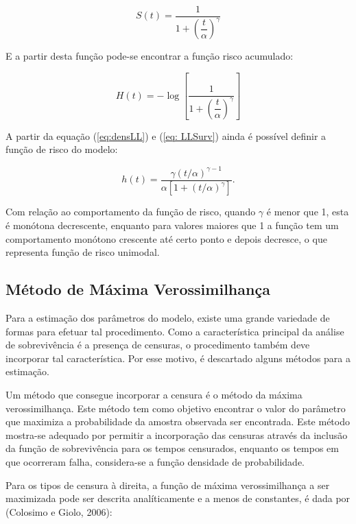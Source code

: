 \documentclass[a4paper,12pt]{article}
\begin{document}
\begin{equation} \label{eq: LLSurv}
  S(t) = \dfrac{1}{1 + \left(\dfrac{t}{\alpha}\right)^{\gamma}}
\end{equation}

E a partir desta função pode-se encontrar a função risco acumulado:

\begin{equation} \label{eq: HazLL}
H(t) = - \log\left[\dfrac{1}{1 + \left(\dfrac{t}{\alpha}\right)^{\gamma}}\right]
\end{equation}


A partir da equação (\ref{eq:densLL}) e (\ref{eq: LLSurv}) ainda é possível definir a função de risco do modelo:

\begin{equation} \label{eq: hazLL}
h(t) = \dfrac{\gamma(t/\alpha)^{\gamma-1}}{\alpha[1+(t/\alpha)^\gamma]}.
\end{equation}

Com relação ao comportamento da função de risco, quando $\gamma$ é menor que 1, esta é monótona decrescente, enquanto para valores maiores que 1 a função tem um comportamento monótono crescente até certo ponto e depois decresce, o que representa função de risco unimodal.


\subsection{Método de Máxima Verossimilhança}

Para a estimação dos parâmetros do modelo, existe uma grande variedade de formas para efetuar tal procedimento. Como a característica principal da análise de sobrevivência é a presença de censuras, o procedimento também deve incorporar tal característica. Por esse motivo, é descartado alguns métodos para a estimação.

Um método que consegue incorporar a censura é o método da máxima verossimilhança. Este método tem como objetivo encontrar o valor do parâmetro que maximiza a probabilidade da amostra observada ser encontrada. Este método mostra-se adequado por permitir a incorporação das censuras através da inclusão da função de sobrevivência para os tempos censurados, enquanto os tempos em que ocorreram falha, considera-se a função densidade de probabilidade.

Para os tipos de censura à direita, a função de máxima verossimilhança a ser maximizada pode ser descrita analíticamente e a menos de constantes, é dada por (Colosimo e Giolo, 2006):
\end{document}
